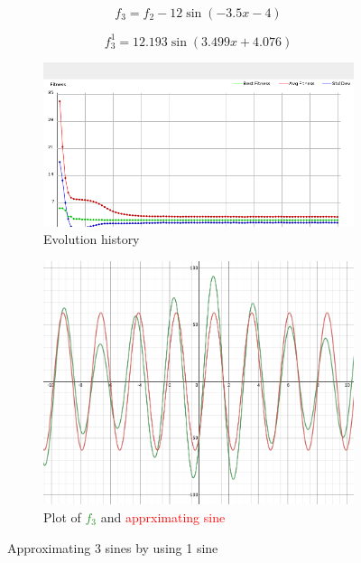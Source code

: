 \documentclass[conference]{IEEEtran}
\begin{document}
\begin{equation}
	f_3 = f_2 - 12\sin(-3.5x-4)
	\label{eq:f3}
\end{equation}

\begin{equation}
	f_3^1 = 12.193\sin(3.499x+4.076)
	\label{eq:f3_pred}
\end{equation}

\begin{figure}[h]
\centering
\begin{subfigure}{.8\linewidth}
  \centering
  \includegraphics[width=.9\linewidth]{img/sin3_1_new.png}
  \caption{Evolution history}
  \label{fig:hist_sin3_1}
\end{subfigure}

\begin{subfigure}{.8\linewidth}
  \centering
  \includegraphics[width=.9\linewidth]{img/plot_sin3_1.png}
  \caption{Plot of \textcolor{ForestGreen}{$f_3$} and \textcolor{red}{apprximating sine}}
  \label{fig:plot_sin3_1}
\end{subfigure}
\caption{Approximating 3 sines by using 1 sine}
\label{fig:sin3_1}
\end{figure}
\end{document}
